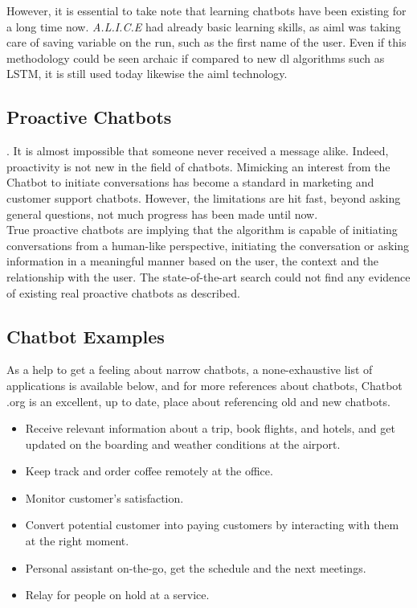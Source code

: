 However, it is essential to take note that learning chatbots have been existing for a long time now. \textit{A.L.I.C.E}\cite{chatbot:alice} had already basic learning skills, as \gls{aiml} was taking care of saving variable on the run, such as the first name of the user. Even if this methodology could be seen archaic if compared to new \gls{dl} algorithms such as LSTM, it is still used today likewise the \gls{aiml} technology.


\subsection{Proactive Chatbots}
. It is almost impossible that someone never received a message alike. Indeed, proactivity is not new in the field of chatbots. Mimicking an interest from the Chatbot to initiate conversations has become a standard in marketing and customer support chatbots. However, the limitations are hit fast, beyond asking general questions, not much progress has been made until now.\\

True proactive chatbots are implying that the algorithm is capable of initiating conversations from a human-like perspective, initiating the conversation or asking information in a meaningful manner based on the user, the context and the relationship with the user. The state-of-the-art search could not find any evidence of existing real proactive chatbots as described.


\subsection{Chatbot Examples}
As a help to get a feeling about narrow chatbots, a none-exhaustive list of applications is available below, and for more references about chatbots, Chatbot .org\cite{chatbot:chatbots-org} is an excellent, up to date, place about referencing old and new chatbots.

\begin{itemize}
\setlength\itemsep{0em}
\item Receive relevant information about a trip, book flights, and hotels, and get updated on the boarding and weather conditions at the airport.
\item Keep track and order coffee remotely at the office.
\item Monitor customer's satisfaction.
\item Convert potential customer into paying customers by interacting with them at the right moment.
\item Personal assistant on-the-go, get the schedule and the next meetings.
\item Relay for people on hold at a service.
\end{itemize}



